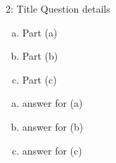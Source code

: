 \begin{problem}{2: Title} Question details
\begin{enumerate}[(a)]
    \item Part (a)
    \item Part (b)
    \item Part (c)
\end{enumerate}
\end{problem}
\begin{sol}
\begin{enumerate}[(a)]
    \item answer for (a)
    \item answer for (b)
    \item answer for (c)
\end{enumerate}
\end{sol}